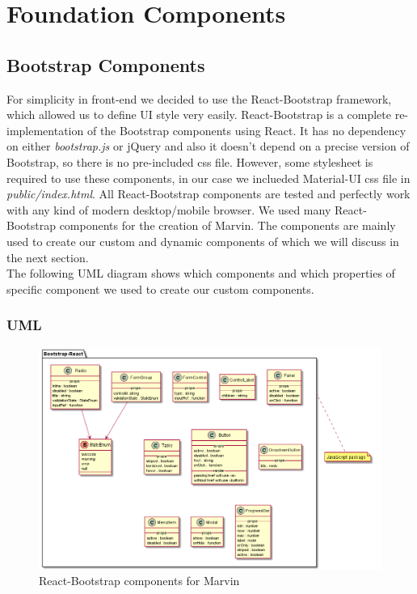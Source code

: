\section{Foundation Components}

	\subsection{Bootstrap Components} For simplicity in front-end we decided to use the React-Bootstrap framework, which allowed us to define UI style very easily. React-Bootstrap is a complete re-implementation of the Bootstrap components using React. It has no dependency on either \textit{bootstrap.js}  or jQuery and also it doesn't depend on a precise version of Bootstrap, so there is no pre-included css file. However, some stylesheet is required to use these components, in our case we inclueded Material-UI css file in \textit{public/index.html}. All React-Bootstrap components are tested and perfectly work with any kind of modern desktop/mobile browser. We used many React-Bootstrap components for the creation of Marvin. The components are mainly used to create our custom and dynamic components 
	of which we will discuss in the next section. \\ The following UML diagram shows which components and which properties of specific component we used to create our custom components. 

		\subsubsection{UML}
		\begin{figure}[h]
			\centering
			\includegraphics[width=1\linewidth]{"diagrammi/react/bootstrap"}
			\caption{React-Bootstrap components for Marvin}
			\label{fig:React-Bootstrap components for Marvin}
		\end{figure}
	\newpage
